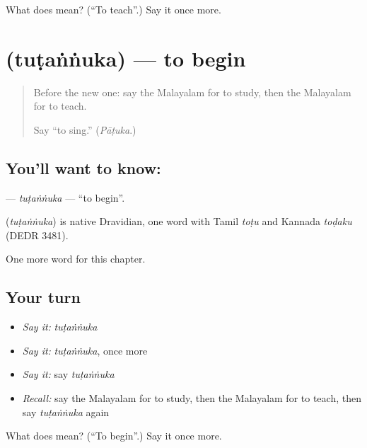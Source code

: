 \begin{tcolorbox}[breakable,colback=teal!4,colframe=teal!35!black,title={Before you move on}]
What does  mean? (\textquotedblleft{}To teach\textquotedblright{}.) Say it once more.
\end{tcolorbox}
\section[\texorpdfstring{\ml{തുടങ്ങുക} (tuṭaṅṅuka)}{തുടങ്ങുക (tuṭaṅṅuka)}]{ (tuṭaṅṅuka) — to begin}

\label{lesson:ML-C173-tutannuka}



\begin{quote}
Before the new one: say the Malayalam for to study, then the Malayalam for to teach.

Say \textquotedblleft{}to sing.\textquotedblright{} (\emph{Pāṭuka}.)
\end{quote}

\subsection*{You'll want to know: }
\textbf{} — \emph{tuṭaṅṅuka} — \textquotedblleft{}to begin\textquotedblright{}.

\begin{cousinweb}
\textbf{} (\emph{tuṭaṅṅuka}) is native Dravidian, one word with Tamil \emph{toṭu} and Kannada \emph{toḍaku} (DEDR 3481).
\end{cousinweb}

\begin{grammarlens}[title={What you've built}]
One more word for this chapter.
\end{grammarlens}

\subsection*{Your turn}
\begin{itemize}
\raggedright
  \item \emph{Say it:} \emph{tuṭaṅṅuka}
  \item \emph{Say it:} \emph{tuṭaṅṅuka}, once more
  \item \emph{Say it:} say \emph{tuṭaṅṅuka}
  \item \emph{Recall:} say the Malayalam for to study, then the Malayalam for to teach, then say \emph{tuṭaṅṅuka} again
\end{itemize}

\begin{tcolorbox}[breakable,colback=teal!4,colframe=teal!35!black,title={Before you move on}]
What does  mean? (\textquotedblleft{}To begin\textquotedblright{}.) Say it once more.
\end{tcolorbox}
